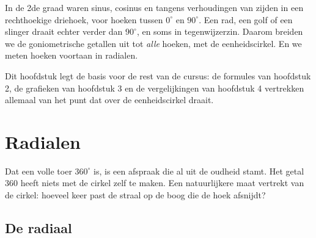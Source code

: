 %



In de 2de graad waren sinus, cosinus en tangens verhoudingen van zijden in een rechthoekige driehoek, voor hoeken tussen $0^\circ$ en $90^\circ$. Een rad, een golf of een slinger draait echter verder dan $90^\circ$, en soms in tegenwijzerzin. Daarom breiden we de goniometrische getallen uit tot \textit{alle} hoeken, met de eenheidscirkel. En we meten hoeken voortaan in radialen.

Dit hoofdstuk legt de basis voor de rest van de cursus: de formules van hoofdstuk 2, de grafieken van hoofdstuk 3 en de vergelijkingen van hoofdstuk 4 vertrekken allemaal van het punt dat over de eenheidscirkel draait.

\begin{oefeningen}[Start]

\end{oefeningen}

\section{Radialen}

Dat een volle toer $360^\circ$ is, is een afspraak die al uit de oudheid stamt. Het getal $360$ heeft niets met de cirkel zelf te maken. Een natuurlijkere maat vertrekt van de cirkel: hoeveel keer past de straal op de boog die de hoek afsnijdt?

\subsection{De radiaal}

